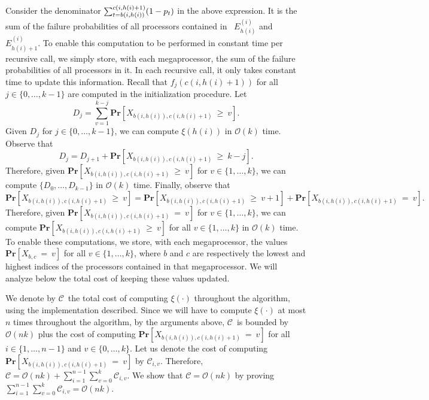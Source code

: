 \documentclass{article}
\newcommand{\ens}[1]{\ensuremath{#1}}					\newcommand{\card}[1]{\ens{|#1|}}							\newcommand{\dotlist}[2]{\ens{#1,\ldots,#2}}
\newcommand{\bigoh}[1]{\ens{\mathcal{O}(#1)}}				\newcommand{\bigom}[1]{\ens{\Omega(#1)}}
\newcommand{\processor}{processor}
\newcommand{\megaprocessor}{mega\processor}
\newcommand{\probgen}[1]{\ens{\mathbf{Pr}\left[#1\right]}}
\newcommand{\hitsum}[2]{\ens{X_{#1,#2}}}					\newcommand{\probeq}[3]{\probgen{\hitsum{#1}{#2}~=~#3}}
\newcommand{\probge}[3]{\probgen{\hitsum{#1}{#2}~\geq~#3}}
\newcommand{\flowin}[2]{\ens{f_{#1}(#2)}}
\newcommand{\xitot}{\ens{\mathcal C}}
\newcommand{\mergeop}[2]{\ens{E_{#2}^{(#1)}}}
\newcommand{\mopfirst}[2]{\ens{b{(#1,#2)}}}
\newcommand{\moplast}[2]{\ens{c{(#1,#2)}}}
\newcommand{\picost}[2]{\ens{\xitot_{#1,#2}}}
\newcommand{\mindex}[1]{\ens{h(#1)}}
\newcommand{\themergeop}[1]{\ens{\mergeop{#1}{\mindex{#1}}}}
\newcommand{\themergeoplus}[1]{\ens{\mergeop{#1}{\mindex{#1}+1}}}
\begin{document}
Consider the denominator 
$\sum_{t=\mopfirst i{\mindex i}}^{\moplast i{\mindex i+1}} (1-\pr t)$
in the above expression.
It is the sum of the failure probabilities of all
{\processor}s contained in 
~\themergeop i and 
\themergeoplus i.
To enable this computation to be performed in constant time per recursive call,
we simply store, with each
{\megaprocessor}, the sum of the failure probabilities of
all {\processor}s in it.  In each recursive call, it only
takes constant time to update this information.
Recall that \flowin{j}{\moplast i{\mindex i+1}} for all $j\in\{0,\ldots,k-1\}$ are computed in the initialization procedure.
Let 
\[
D_{j} = \sum_{v= 1}^{k-j}\probge{\mopfirst i{\mindex i}}{\moplast i{\mindex i + 1}}v	.
\]
Given $D_{j}$ for $j\in\{0,\ldots,k-1\}$, we can compute $\xi(\mindex i)$ in \bigoh k time.
Observe that 
\[
D_{j} = D_{j+1} + \probge{\mopfirst i{\mindex i}}{\moplast i{\mindex i + 1}}{k-j}.
\]
Therefore, given \probge{\mopfirst i{\mindex i}}{\moplast i{\mindex i + 1}}v for $v\in\{1,\ldots,k\}$, we can compute  $\{D_{0},\ldots,D_{k-1}\}$ in \bigoh k time. Finally, observe that
\[
\probge{\mopfirst i{\mindex i}}{\moplast i{\mindex i + 1}}v = \probge{\mopfirst i{\mindex i}}{\moplast i{\mindex i + 1}}{v+1} + \probeq{\mopfirst i{\mindex i}}{\moplast i{\mindex i + 1}}v.
\]
Therefore, given $\probeq{\mopfirst i{\mindex i}}{\moplast i{\mindex i + 1}}v$ for $v\in\{1,\ldots,k\}$, we can compute $\probge{\mopfirst i{\mindex i}}{\moplast i{\mindex i + 1}}v$ for all $v\in\{1,\ldots,k\}$ in \bigoh k time. 
To enable these computations,
we store, with each
{\megaprocessor}, 
the values \probeq{b}{c}v for all $v\in\{1,\ldots,k\}$, 
where $b$ and $c$ are respectively the lowest and highest indices of
the {\processor}s contained in that {\megaprocessor}.
We will analyze below the total cost of keeping these values updated.

We denote by \xitot\ the total cost of computing $\xi(\cdot)$ throughout the algorithm, using the implementation described.
Since we will have to compute $\xi(\cdot)$ at most $n$ times throughout the algorithm, by the arguments above, \xitot\ is bounded by $\bigoh{nk}$ plus the cost of computing $\probeq{\mopfirst i{\mindex i}}{\moplast i{\mindex i + 1}}v$ for all $i\in\{1,\ldots,n-1\}$ and $v\in\{0,\ldots,k\}$. 
Let us denote the cost of computing $\probeq{\mopfirst i{\mindex i}}{\moplast i{\mindex i + 1}}v$ by \picost iv. Therefore, $\xitot = \bigoh{nk} + \sum_{i=1}^{n-1}\sum_{v=0}^{k}\picost iv$. We show that $\xitot = \bigoh{nk}$ by proving $\sum_{i=1}^{n-1}\sum_{v=0}^{k}\picost iv =\bigoh{nk}$. 
\end{document}
